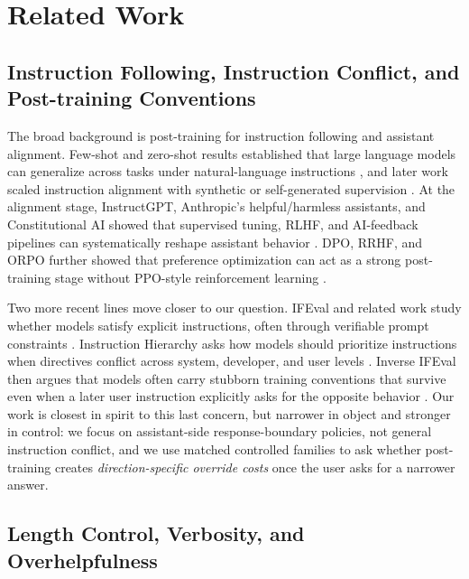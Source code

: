 \documentclass[11pt]{article}
\begin{document}
\section{Related Work}

\subsection{Instruction Following, Instruction Conflict, and Post-training Conventions}

The broad background is post-training for instruction following and assistant alignment. Few-shot and zero-shot results established that large language models can generalize across tasks under natural-language instructions \citep{brown2020gpt3,wei2021flan,sanh2021t0,mishra2021naturalinstructions}, and later work scaled instruction alignment with synthetic or self-generated supervision \citep{wang2022selfinstruct}. At the alignment stage, InstructGPT, Anthropic's helpful/harmless assistants, and Constitutional AI showed that supervised tuning, RLHF, and AI-feedback pipelines can systematically reshape assistant behavior \citep{ouyang2022instructgpt,bai2022hh,bai2022constitutional}. DPO, RRHF, and ORPO further showed that preference optimization can act as a strong post-training stage without PPO-style reinforcement learning \citep{rafailov2023dpo,yuan2023rrhf,hong2024orpo}.

Two more recent lines move closer to our question. IFEval and related work study whether models satisfy explicit instructions, often through verifiable prompt constraints \citep{zhou2023ifeval}. Instruction Hierarchy asks how models should prioritize instructions when directives conflict across system, developer, and user levels \citep{wallace2024instructionhierarchy}. Inverse IFEval then argues that models often carry stubborn training conventions that survive even when a later user instruction explicitly asks for the opposite behavior \citep{zhang2025inverseifeval}. Our work is closest in spirit to this last concern, but narrower in object and stronger in control: we focus on assistant-side response-boundary policies, not general instruction conflict, and we use matched controlled families to ask whether post-training creates \emph{direction-specific override costs} once the user asks for a narrower answer.

\subsection{Length Control, Verbosity, and Overhelpfulness}
\end{document}
